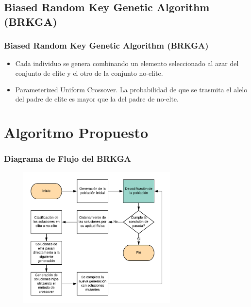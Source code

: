 \documentclass{beamer}
\begin{document}

\subsection{Biased Random Key Genetic Algorithm (BRKGA)}

\begin{frame}
\frametitle{Biased Random Key Genetic Algorithm (BRKGA)}

\begin{itemize}
    \item Cada individuo se genera combinando un elemento seleccionado al azar del conjunto de elite y el otro de la conjunto no-elite.
    \pause
    \item Parameterized Uniform Crossover. La probabilidad de que se trasmita el alelo del padre de elite es mayor que la del padre de no-elte.
    \pause
\end{itemize}

\end{frame}


\section{Algoritmo Propuesto}

\begin{frame}
\frametitle{Diagrama de Flujo del BRKGA}

\begin{figure}[h]
	\centering
	\includegraphics[width=8cm]{BRKGA_Flow_Chart_Base}
	\label{fig:BRKGA_Flow_Chart_Base}
\end{figure}

\end{frame}
\end{document}
